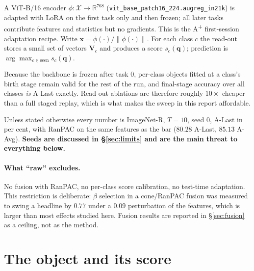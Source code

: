 \documentclass[10pt,twocolumn]{article}
\newcommand{\R}{\mathbb{R}}
\newcommand{\bx}{\mathbf{x}}
\newcommand{\bq}{\mathbf{q}}
\newcommand{\bV}{\mathbf{V}}
\begin{document}
A ViT-B/16 encoder $\phi:\mathcal{X}\to\R^{768}$
(\texttt{vit\_base\_patch16\_224.augreg\_in21k}) is adapted with LoRA on the
first task only and then frozen; all later tasks contribute features and
statistics but no gradients. This is the A\textsuperscript{+} first-session
adaptation recipe. Write $\bx=\phi(\cdot)/\lVert\phi(\cdot)\rVert$. For each
class $c$ the read-out stores a small set of vectors $\bV_c$ and produces a
score $s_c(\bq)$; prediction is $\arg\max_{c\in\text{seen}}s_c(\bq)$.

Because the backbone is frozen after task $0$, per-class objects fitted at a
class's birth stage remain valid for the rest of the run, and final-stage
accuracy over all classes \emph{is} A-Last exactly. Read-out ablations are
therefore roughly $10\times$ cheaper than a full staged replay, which is what
makes the sweep in this report affordable.

Unless stated otherwise every number is ImageNet-R, $T{=}10$, seed $0$, A-Last
in per cent, with RanPAC on the same features as the bar ($80.28$ A-Last,
$85.13$ A-Avg). \textbf{Seeds are discussed in \S\ref{sec:limits} and are the
main threat to everything below.}

\paragraph{What ``raw'' excludes.} No fusion with RanPAC, no per-class score
calibration, no test-time adaptation. This restriction is deliberate: $\beta$
selection in a cone/RanPAC fusion was measured to swing a headline by $0.77$
under a $0.09$ perturbation of the features, which is larger than most effects
studied here. Fusion results are reported in \S\ref{sec:fusion} as a ceiling,
not as the method.

\section{The object and its score}
\end{document}
